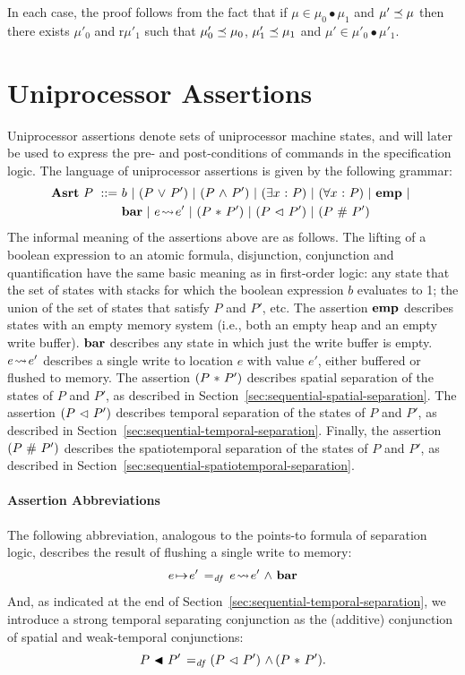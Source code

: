 \documentclass[11pt]{report}
\begin{document}
In each case, the proof follows from the fact that if $\mu \in \mu_0 \bullet \mu_1$ and $\mu' \preceq \mu$ then there exists $\mu'_0$ and r$\mu'_1$ such that $\mu'_0 \preceq \mu_0$, $\mu'_1 \preceq \mu_1$ and $\mu' \in \mu'_0 \bullet \mu'_1$. 

\section{Uniprocessor Assertions}
\label{sec:uniprocessor-assertions}

Uniprocessor assertions denote sets of uniprocessor machine states, and will later be used to express the pre- and post-conditions of commands in the specification logic. The language of uniprocessor assertions is given by the following grammar: \begin{align*}
    \mathbf{Asrt}~P ~::=~ & b ~|~ (P \operatorname{\,\vee\,} P') ~|~ (P \operatorname{\,\wedge\,} P') ~|~ (\exists x \operatorname{\,:\,} P) ~|~ (\forall x \operatorname{\,:\,} P) ~|~ \mathbf{emp} ~|~ \\ & \mathbf{bar} ~|~ e \!\leadsto\! e' ~|~ (P \operatorname{\,\ast\,} P') ~|~  (P \operatorname{\,\vartriangleleft\,} P') ~|~ (P \operatorname{\,\#\,} P')
\end{align*} 
The informal meaning of the assertions above are as follows. The lifting of a boolean expression to an atomic formula, disjunction, conjunction and quantification have the same basic meaning as in first-order logic: any state that the set of states with stacks for which the boolean expression $b$ evaluates to 1; the union of the set of states that satisfy $P$ and $P'$, etc. The assertion $\mathbf{emp}$ describes states with an empty memory system (i.e., both an empty heap and an empty write buffer). $\mathbf{bar}$ describes any state in which just the write buffer is empty. $e \!\leadsto\! e'$ describes a single write to location $e$ with value $e'$, either buffered or flushed to memory. The assertion $(P \operatorname{\,\ast\,} P')$ describes spatial separation of the states of $P$ and $P'$, as described in Section~\ref{sec:sequential-spatial-separation}. The assertion $(P \operatorname{\,\vartriangleleft\,} P')$ describes temporal separation of the states of $P$ and $P'$, as described in Section~\ref{sec:sequential-temporal-separation}.  Finally, the assertion $(P \operatorname{\,\#\,} P')$ describes the spatiotemporal separation of the states of $P$ and $P'$, as described in Section~\ref{sec:sequential-spatiotemporal-separation}.

\paragraph{Assertion Abbreviations} The following abbreviation, analogous to the points-to formula of separation logic, describes the result of flushing a single write to memory: \[
    e \!\mapsto\! e' \operatorname{\;=_{\mathit{df}}\;} e \!\leadsto\! e' \operatorname{\,\wedge\,} \mathbf{bar} \] And, as indicated at the end of Section~\ref{sec:sequential-temporal-separation}, we introduce a strong temporal separating conjunction as the (additive) conjunction of spatial and weak-temporal conjunctions: \[ P \operatorname{\,\blacktriangleleft\,} P' \operatorname{\;=_{\mathit{df}}\;} (P \operatorname{\,\vartriangleleft\,} P') \operatorname{\,\wedge\,} (P \operatorname{\,\ast\,} P').\]
\end{document}

